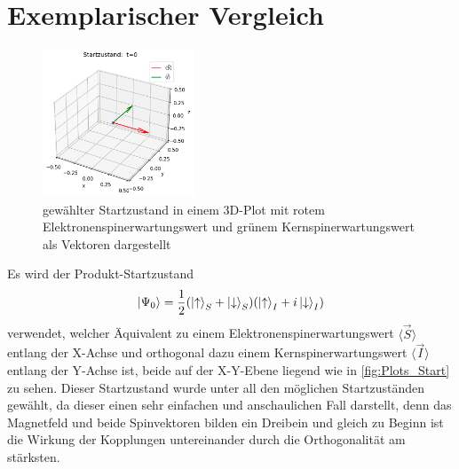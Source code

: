 \section{Exemplarischer Vergleich}
\begin{figure}
    \centering
    \includegraphics[width = 0.4\textwidth]{Abbildungen/Plot_Vektor_Start.png}
    \caption{gewählter Startzustand in einem 3D-Plot mit rotem Elektronenspinerwartungswert und grünem Kernspinerwartungswert als Vektoren dargestellt}
    \label{fig:Plots_Start}
\end{figure}
Es wird der Produkt-Startzustand 
\begin{align}
    \ket{\Psi_0}=\frac{1}{2}(\ket{\uparrow}_S + \ket{\downarrow}_S)(\ket{\uparrow}_I + i\ket{\downarrow}_I)
\end{align}
verwendet, welcher Äquivalent zu einem Elektronenspinerwartungswert $\langle\vec{S}\rangle$ entlang der X-Achse und orthogonal
dazu einem Kernspinerwartungswert $\langle\vec{I}\rangle$ entlang der Y-Achse ist, beide auf der X-Y-Ebene liegend wie in \autoref{fig:Plots_Start} zu sehen.
Dieser Startzustand wurde unter all den möglichen Startzuständen gewählt, da dieser einen sehr einfachen und anschaulichen Fall darstellt, denn das Magnetfeld und beide Spinvektoren 
bilden ein Dreibein und gleich zu Beginn ist die Wirkung der Kopplungen untereinander durch die Orthogonalität am stärksten.

